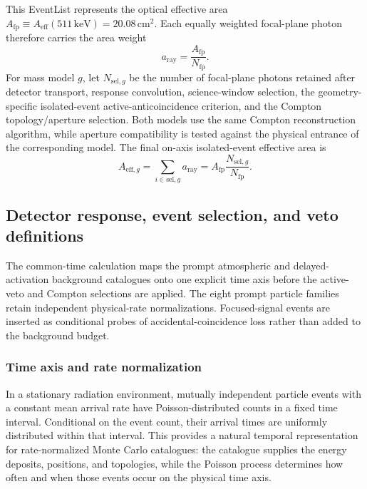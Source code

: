 \documentclass[11pt]{article}
\newcommand{\keV}{\ensuremath{\,\mathrm{keV}}}
\begin{document}
This EventList represents the optical effective area
$A_{\mathrm{fp}}\equiv A_{\mathrm{eff}}(511\keV)=20.08\,\mathrm{cm^2}$.
Each equally weighted focal-plane photon therefore carries the area weight
\begin{equation}
 a_{\mathrm{ray}}=\frac{A_{\mathrm{fp}}}{N_{\mathrm{fp}}}.
 \label{eq:focal_eventlist_area_weight}
\end{equation}
For mass model $g$, let $N_{\mathrm{sel},g}$ be the number of focal-plane
photons retained after detector transport, response convolution, science-window
selection, the geometry-specific isolated-event active-anticoincidence
criterion, and the Compton topology/aperture selection. Both models use the
same Compton reconstruction algorithm, while aperture compatibility is tested
against the physical entrance of the corresponding model. The final on-axis
isolated-event effective area is
\begin{equation}
 A_{\mathrm{eff},g}
 =\sum_{i\in\mathrm{sel},g}a_{\mathrm{ray}}
 =A_{\mathrm{fp}}\frac{N_{\mathrm{sel},g}}{N_{\mathrm{fp}}}.
 \label{eq:selected_signal_effective_area}
\end{equation}

\endgroup



\subsection{Detector response, event selection, and veto definitions}
\label{sec:selection}

The common-time calculation maps the prompt atmospheric and delayed-activation
background catalogues onto one explicit time axis before the active-veto and
Compton selections are applied. The eight prompt particle families
retain independent physical-rate normalizations. Focused-signal events are inserted as
conditional probes of accidental-coincidence loss rather than added to the
background budget.

\subsubsection{Time axis and rate normalization}
\label{subsec:time_axis}

In a stationary radiation environment, mutually independent particle events
with a constant mean arrival rate have Poisson-distributed counts in a fixed
time interval. Conditional on the event count, their arrival times are
uniformly distributed within that interval. This provides a natural temporal
representation for rate-normalized Monte Carlo catalogues: the catalogue
supplies the energy deposits, positions, and topologies, while the Poisson
process determines how often and when those events occur on the physical time
axis.
\end{document}
